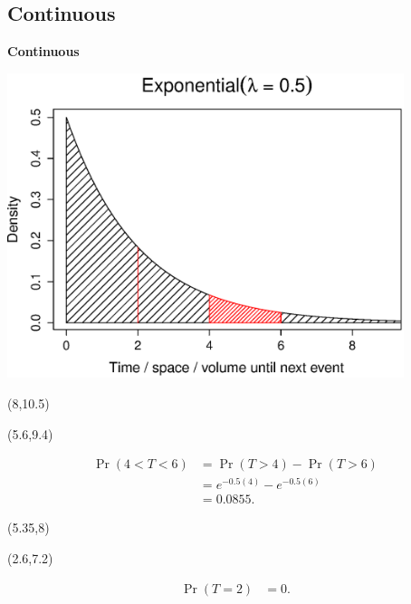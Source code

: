 \documentclass[compress]{beamer}        %
\makeatletter
\newcommand{\tcb}{\textcolor{beamer@blendedblue}}
\makeatother
\begin{document}
\subsection{Continuous}
\begin{frame}{\bf \tcb{Continuous}\\[-1.1cm]}\label{expplot}
\begin{center}
\includegraphics[width=0.87\textwidth, trim = 0.0cm 0.5cm 0.3cm 0.5cm, clip]{Exponential}
\end{center}
\begin{textblock}{1}(8,10.5)
\xymatrixcolsep{0.7cm}
\end{textblock}
\begin{textblock}{10}(5.6,9.4)
\begin{scriptsize}
\begin{align*}
\Pr(4<T<6) &= \Pr(T > 4) - \Pr(T > 6) \\
&= e^{-0.5(4)} - e^{-0.5(6)} \\&= 0.0855.
\end{align*}
\end{scriptsize}
\end{textblock}
\begin{textblock}{1}(5.35,8)
\xymatrixcolsep{1cm}
\end{textblock}
\begin{textblock}{10}(2.6,7.2)
\begin{scriptsize}
\begin{align*}
\Pr(T=2) &= 0.
\end{align*}
\end{scriptsize}
\end{textblock}
\end{frame}
\end{document}

